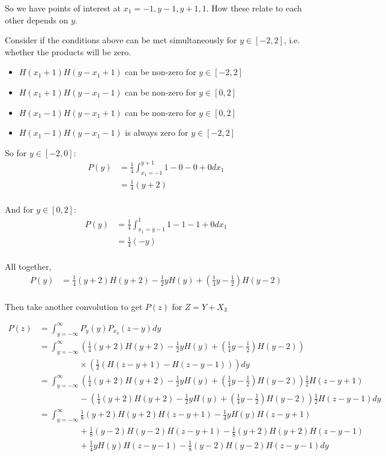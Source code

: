 So we have points of interest at $x_1 = -1, y-1, y+1, 1$. How these relate to each other depends on $y$.

Consider if the conditions above can be met simultaneously for $y \in [-2,2]$, i.e. whether the products will be zero.
\begin{itemize}
    \item $H(x_1+1)H(y-x_1+1)$ can be non-zero for $y \in [-2,2]$
    \item $H(x_1+1)H(y-x_1-1)$ can be non-zero for $y \in [0,2]$
    \item $H(x_1-1)H(y-x_1+1)$ can be non-zero for $y \in [0,2]$
    \item $H(x_1-1)H(y-x_1-1)$ is always zero for $y \in [-2,2]$
\end{itemize}

So for $y \in [-2, 0]$:
\begin{align*}
    P(y) &= \frac{1}{4}\int_{x_1 =-1}^{y+1} 1 - 0- 0 + 0 dx_1 \\
    &= \frac{1}{4}(y+2) \\
\end{align*}

And for $y \in [0, 2]$:
\begin{align*}
    P(y) &= \frac{1}{4}\int_{x_1=y-1}^{1} 1 - 1 - 1 + 0 dx_1 \\
    &= \frac{1}{4}(-y) \\
\end{align*}

All together,
\begin{align*}
    P(y) &= \frac{1}{4}(y+2)H(y+2) - \frac{1}{2}yH(y) 
    + (\frac{1}{4}y-\frac{1}{2})H(y-2) \\
\end{align*}

Then take another convolution to get $P(z)$ for $Z = Y + X_3$

\begin{align*}
    P(z) &= \int_{y =-\infty}^{\infty} P_{y}(y)P_{x_3}(z-y) dy \\
    &= \int_{y =-\infty}^{\infty} \left(\frac{1}{4}(y+2)H(y+2) - \frac{1}{2}yH(y) 
    + (\frac{1}{4}y-\frac{1}{2})H(y-2)\right)\\
    &\hspace{2cm}\times\left(\frac{1}{2}(H(z-y+1) - H(z-y-1))\right) dy \\
    &= \int_{y =-\infty}^{\infty} \left(\frac{1}{4}(y+2)H(y+2) - \frac{1}{2}yH(y) 
    + (\frac{1}{4}y-\frac{1}{2})H(y-2)\right)\frac{1}{2}H(z-y+1)\\
    &\hspace{2cm}- \left(\frac{1}{4}(y+2)H(y+2) - \frac{1}{2}yH(y) 
    + (\frac{1}{4}y-\frac{1}{2})H(y-2)\right)\frac{1}{2}H(z-y-1) dy \\
    &= \int_{y =-\infty}^{\infty} \frac{1}{8}(y+2)H(y+2)H(z-y+1) - \frac{1}{4}yH(y)H(z-y+1) \\
    &\hspace{2cm}+ \frac{1}{8}(y-2)H(y-2)H(z-y+1) - \frac{1}{8}(y+2)H(y+2)H(z-y-1) \\
    &\hspace{2cm}+ \frac{1}{4}yH(y)H(z-y-1) - \frac{1}{8}(y-2)H(y-2)H(z-y-1) dy \\
\end{align*}

